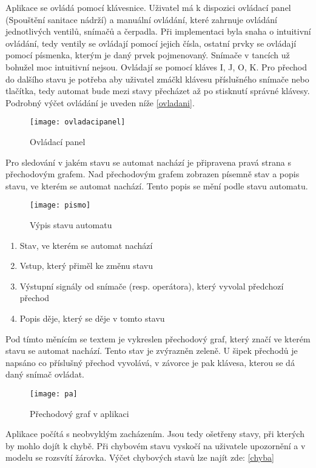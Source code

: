 \documentclass[12pt, a4paper]{article}
\begin{document}
Aplikace se ovládá pomocí klávesnice. Uživatel má k dispozici ovládací panel (Spouštění sanitace nádrží) a manuální ovládání, které zahrnuje ovládání jednotlivých ventilů, snímačů a čerpadla. Při implementaci byla snaha o intuitivní ovládání, tedy ventily se ovládají pomocí jejich čísla, ostatní prvky se ovládají pomocí písmenka, kterým je daný prvek pojmenovaný. Snímače v tancích už bohužel moc intuitivní nejsou. Ovládají se pomocí kláves I, J, O, K. Pro přechod do dalšího stavu je potřeba aby uživatel zmáčkl klávesu příslušného snímače nebo tlačítka, tedy automat bude mezi stavy přecházet až po stisknutí správné klávesy. Podrobný výčet ovládání je uveden níže \ref{ovladani}. 

\begin{figure}[h]
\centering 
\texttt{[image: ovladacipanel]}
\caption{Ovládací panel}
\end{figure}
\newpage

Pro sledování v jakém stavu se automat nachází je připravena pravá strana s přechodovým grafem. Nad přechodovým grafem zobrazen písemně stav a popis stavu, ve kterém se automat nachází. Tento popis se mění podle stavu automatu.

\begin{figure}[h]
\centering 
\texttt{[image: pismo]}
\caption{Výpis stavu automatu}
\end{figure}

\begin{enumerate}
  \item Stav, ve kterém se automat nachází
  \item Vstup, který přiměl ke změnu stavu
  \item Výstupní signály od snímače (resp. operátora), který vyvolal předchozí přechod
  \item Popis děje, který se děje v tomto stavu
\end{enumerate}

Pod tímto měnícím se textem je vykreslen přechodový graf, který značí ve kterém stavu se automat nachází. Tento stav je zvýrazněn zeleně. U šipek přechodů je napsáno co příslušný přechod vyvolává, v závorce je pak klávesa, kterou se dá daný snímač ovládat.

\begin{figure}[h!]
\centering 
\texttt{[image: pa]}
\caption{Přechodový graf v aplikaci}
\end{figure}    

Aplikace počítá s neobvyklým zacházením. Jsou tedy ošetřeny stavy, při kterých by mohlo dojít k chybě. Při chybovém stavu vyskočí na uživatele upozornění a v modelu se rozsvítí žárovka. Výčet chybových stavů lze najít zde: \ref{chyba}
\end{document}
